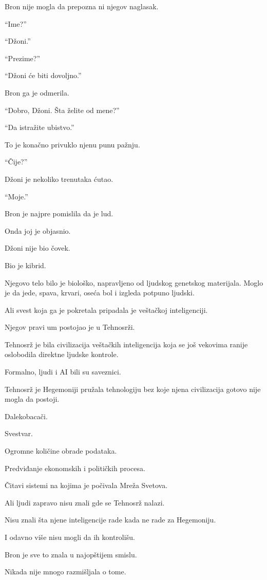 Bron nije mogla da prepozna ni njegov naglasak.

``Ime?''

``Džoni.''

``Prezime?''

``Džoni će biti dovoljno.''

Bron ga je odmerila.

``Dobro, Džoni. Šta želite od mene?''

``Da istražite ubistvo.''

To je konačno privuklo njenu punu pažnju.

``Čije?''

Džoni je nekoliko trenutaka ćutao.

``Moje.''

\bigskip

Bron je najpre pomislila da je lud.

Onda joj je objasnio.

Džoni nije bio čovek.

Bio je kibrid.

Njegovo telo bilo je biološko, napravljeno od ljudskog genetskog materijala. Moglo je da jede, spava, krvari, oseća bol i izgleda potpuno ljudski.

Ali svest koja ga je pokretala pripadala je veštačkoj inteligenciji.

Njegov pravi um postojao je u Tehnosrži.

Tehnosrž je bila civilizacija veštačkih inteligencija koja se još vekovima ranije oslobodila direktne ljudske kontrole.

Formalno, ljudi i AI bili su saveznici.

Tehnosrž je Hegemoniji pružala tehnologiju bez koje njena civilizacija gotovo nije mogla da postoji.

Dalekobacači.

Svestvar.

Ogromne količine obrade podataka.

Predviđanje ekonomskih i političkih procesa.

Čitavi sistemi na kojima je počivala Mreža Svetova.

Ali ljudi zapravo nisu znali gde se Tehnosrž nalazi.

Nisu znali šta njene inteligencije rade kada ne rade za Hegemoniju.

I odavno više nisu mogli da ih kontrolišu.

Bron je sve to znala u najopštijem smislu.

Nikada nije mnogo razmišljala o tome.


